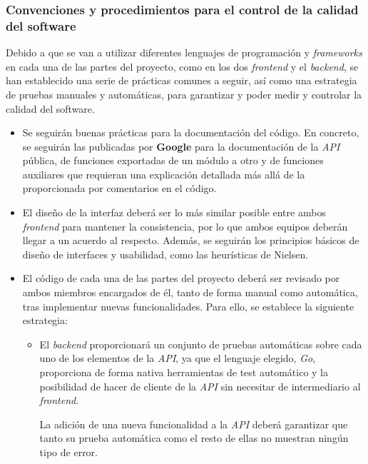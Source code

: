 \documentclass[11pt, a4paper, titlepage]{article}
\begin{document}
\subsubsection{Convenciones y procedimientos para el control de la calidad del software}

Debido a que se van a utilizar diferentes lenguajes de programación y \textit{frameworks} en cada una de las partes del proyecto, como en los dos \textit{frontend} y el \textit{backend}, se han establecido una serie de prácticas comunes a seguir, así como una estrategia de pruebas manuales y automáticas, para garantizar y poder medir y controlar la calidad del software.

\begin{itemize}
    \item Se seguirán buenas prácticas para la documentación del código. En concreto, se seguirán las publicadas por \textbf{Google}\cite{documentaciongoogle} para la documentación de la \textit{API} pública, de funciones exportadas de un módulo a otro y de funciones auxiliares que requieran una explicación detallada más allá de la proporcionada por comentarios en el código.

    \item El diseño de la interfaz deberá ser lo más similar posible entre ambos \textit{frontend} para mantener la consistencia, por lo que ambos equipos deberán llegar a un acuerdo al respecto. Además, se seguirán los principios básicos de diseño de interfaces y usabilidad, como las heurísticas de Nielsen\cite{heuristicasnielsen}.

    \item El código de cada una de las partes del proyecto deberá ser revisado por ambos miembros encargados de él, tanto de forma manual como automática, tras implementar nuevas funcionalidades. Para  ello, se establece la siguiente estrategia:
    \begin{itemize}
        \item El \textit{backend} proporcionará un conjunto de pruebas automáticas sobre cada uno de los elementos de la \textit{API}, ya que el lenguaje elegido, \textit{Go}, proporciona de forma nativa herramientas de test automático y la posibilidad de hacer de cliente de la \textit{API} sin necesitar de intermediario al \textit{frontend}.

        La adición de una nueva funcionalidad a la \textit{API} deberá garantizar que tanto su prueba automática como el resto de ellas no muestran ningún tipo de error.


\end{itemize}
\end{itemize}
\end{document}
